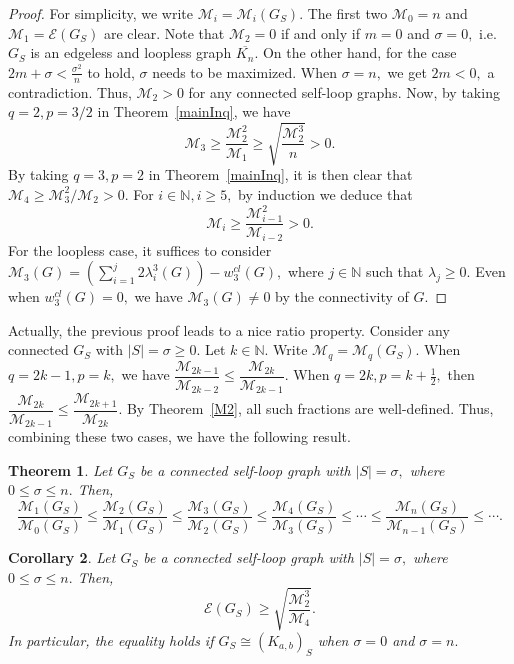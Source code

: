 \documentclass[12pt,a4paper,reqno]{amsart}
\numberwithin{equation}{section}
\theoremstyle{plain}
\newtheorem{theorem}{Theorem}[section]
\newtheorem{corollary}[theorem]{Corollary}
\theoremstyle{definition}
\newcommand{\<}{\langle}
\renewcommand{\>}{\rangle}
\newcommand{\cE}{{\mathcal E}}
\newcommand{\cM}{{\mathcal M}}
\newcommand{\N}{{\mathbb N}}
\begin{document}
\begin{proof}
For simplicity, we write $\cM_i=\cM_i(G_S).$
The first two $\cM_0=n$ and $\cM_1=\cE(G_S)$ are clear. Note that $\cM_2=0$ if and only if $m=0$ and $\sigma=0,$ i.e. $G_S$ is an edgeless and loopless graph  $\overline{K_n}$. On the other hand, for the case $2m+\sigma < \frac{\sigma^2}{n}$ to hold, $\sigma$ needs to be maximized. When $\sigma=n,$ we get $2m<0,$ a contradiction. Thus, $\cM_2>0$ for any connected self-loop graphs.  Now, by taking  $q=2, p=3/2$ in Theorem~\ref{mainInq}, we have 
\[
\cM_3 \geq \frac{\cM_2^2}{\cM_1} \geq \sqrt{\frac{\cM_2^3}{n}}>0.
\]
By taking $q=3, p=2$ in Theorem~\ref{mainInq}, it is then clear that $\cM_4\geq \cM^2_3/\cM_2 >0.$ For $i \in \N, i\geq 5,$  by induction we deduce that 
\[
\cM_i \geq \frac{\cM^2_{i-1}}{\cM_{i-2}} >0. 
\]
For the loopless case, it suffices to
consider $\cM_3(G)= (\sum^j_{i=1} 2\lambda_i^3(G)) - w_3^{cl}(G),$ where $j \in \N$ such that $\lambda_j \geq 0.$ Even when $w_3^{cl}(G)=0,$ we have $\cM_3(G)\neq 0$ by the connectivity of $G.$  %
\end{proof}


Actually, the previous proof leads to a nice ratio property. Consider any connected $G_S$ with $|S|=\sigma \geq 0.$ 
Let $k\in \N.$ Write $\cM_{q}=\cM_q(G_S).$ When $q=2k-1, p=k,$ we have $\dfrac{\cM_{2k-1}}{\cM_{2k-2}} \leq \dfrac{\cM_{2k}}{\cM_{2k-1}}.$ When $q= 2k, p=k+\frac12,$ then $\dfrac{\cM_{2k}}{\cM_{2k-1}} \leq \dfrac{\cM_{2k+1}}{\cM_{2k}}.$ By Theorem~\ref{M2}, all such fractions are well-defined. Thus, combining these two cases, we have the following result. 


\begin{theorem}
\label{mainInq2}
Let $G_S$ be a connected self-loop graph with $|S|=\sigma,$ where $0 \leq \sigma \leq n.$ 
Then,
\begin{equation}
\label{eq:ratio}
\frac{\cM_{1}(G_S)}{\cM_{0}(G_S)} \leq \frac{\cM_{2}(G_S)}{\cM_{1}(G_S)} \leq 
\frac{\cM_{3}(G_S)}{\cM_{2}(G_S)} \leq \frac{\cM_{4}(G_S)}{\cM_{3}(G_S)} \leq \cdots \leq \frac{\cM_{n}(G_S)}{\cM_{n-1}(G_S)} \leq \cdots.  
\end{equation}
\end{theorem}
\vspace{1em} 


\begin{corollary}
\label{lb1}
Let $G_S$ be a connected self-loop graph with $|S|=\sigma,$ where $0 \leq \sigma \leq n.$ Then,
\begin{equation}
\label{eq:lb1}
\cE(G_S) \geq \sqrt{\frac{\cM_2^3}{\cM_4}}.
\end{equation}
In particular, the equality holds if $G_S \cong (K_{a,b})_S$ when $\sigma=0$ and $\sigma=n.$  
\end{corollary}
\end{document}
